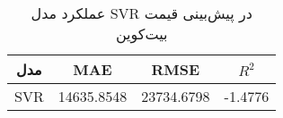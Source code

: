 
        \begin{table}[h]
            \centering
            \begin{tabular}{cccc}
                \toprule
                \textbf{مدل} & \textbf{MAE} & \textbf{RMSE} & \textbf{ \(R^2\) } \\
                \midrule
                SVR & 14635.8548 & 23734.6798 & -1.4776 \\
                \bottomrule
            \end{tabular}
            \caption{عملکرد مدل SVR در پیش‌بینی قیمت بیت‌کوین}
            \label{tab:svr_performance}
        \end{table}
        